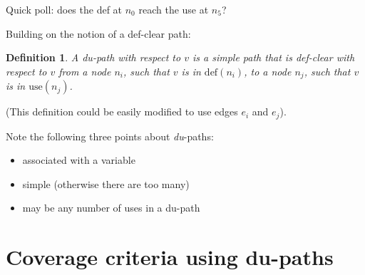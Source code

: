 \documentclass[11pt]{article}
\newtheorem{defn}{Definition}
\begin{document}
Quick poll: does the def at $n_0$ reach the use at $n_5$?
\begin{center}
\end{center}
Building on the notion of a def-clear path:

\begin{defn}
A \emph{du-path} with respect to $v$ is a simple path that is def-clear with
respect to $v$ from a node $n_i$, such that $v$ is in $\mbox{def}(n_i)$,
to a node $n_j$, such that $v$ is in $\mbox{use}(n_j)$.
\end{defn}

(This definition could be easily modified to use edges $e_i$ and $e_j$).

{\sf Note the following three points about \emph{du}-paths:}
\begin{itemize}
\item associated with a variable
\item simple (otherwise there are too many)
\item may be any number of uses in a du-path
\end{itemize}

\section*{Coverage criteria using \mbox{du}-paths}
\end{document}
